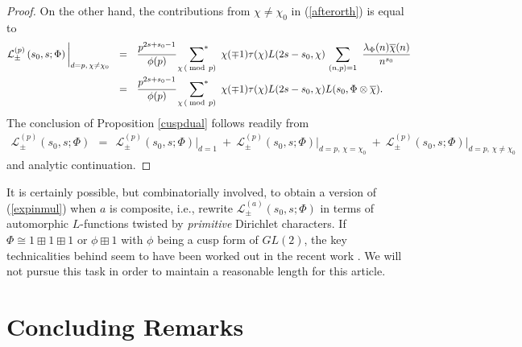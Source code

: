 \documentclass[11pt,reqno]{amsart}
\theoremstyle{definition}
\theoremstyle{definition}
\theoremstyle{remark}
\numberwithin{equation}{section}
\begin{document}
\begin{proof}
	On the other hand,  the contributions from $\chi\neq \chi_{0}$ in (\ref{afterorth}) is equal to 
	\begin{align}
			\mathcal{L}^{(p)}_{\pm}\left(s_{0}, s; \Phi\right) \bigg|_{d=p, \, \chi\neq \chi_{0}}  \ \ &= \  \   \frac{p^{2s+s_{0}-1}}{\phi(p)}  \     \sideset{}{^*}{\sum}_{\chi \, (\bmod\, p)} \  \chi(\mp 1)\tau(\chi) L(2s-s_{0}, \chi)  \, \sum_{(n,p)=1} \ \frac{\lambda_{\Phi}(n)\overline{\chi}(n)}{n^{s_{0}}}   \nonumber\\
			\ \ &= \ \   \frac{p^{2s+s_{0}-1}}{\phi(p)}  \     \sideset{}{^*}{\sum}_{\chi \, (\bmod\, p)} \  \chi(\mp 1)\tau(\chi) L(2s-s_{0}, \chi) L(s_{0}, \Phi\otimes \overline{\chi}). \nonumber
	\end{align}
	The conclusion of Proposition \ref{cuspdual} follows readily from
	\begin{align*}
			\mathcal{L}^{(p)}_{\pm}\left(s_{0}, s; \Phi \right)  \ \ = \ \  	\mathcal{L}^{(p)}_{\pm}\left(s_{0}, s; \Phi \right) \bigg|_{d=1} \ + \  	\mathcal{L}^{(p)}_{\pm}\left(s_{0}, s; \Phi\right) \bigg|_{d=p, \, \chi=\chi_{0}}   \ + \ 	\mathcal{L}^{(p)}_{\pm}\left(s_{0}, s; \Phi\right) \bigg|_{d=p, \, \chi\neq \chi_{0}}  
	\end{align*}
	and   analytic continuation. 

\end{proof}


It is certainly possible, but combinatorially involved, to obtain a version of (\ref{expinmul}) when $a$ is composite, i.e.,   rewrite $\mathcal{L}^{(a)}_{\pm}\left(s_{0}, s; \Phi \right)$ in terms of automorphic $L$-functions twisted by \textit{primitive} Dirichlet characters.  If $\Phi \cong 1 \boxplus 1 \boxplus 1$ or $\phi \boxplus 1$ with $\phi$ being a cusp form of $GL(2)$, the key technicalities behind seem to have been worked out in the recent work \cite{DHKL20}.   We will not pursue this task in order to maintain a reasonable length for this article.




\section{Concluding Remarks}\label{concrem}
\end{document}
